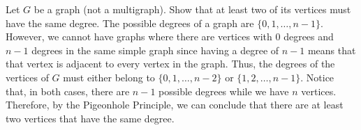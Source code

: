 \begin{hwproblem}{2}{
    Let $G$ be a graph (not a multigraph). Show that at least two of its 
    vertices must have the same degree.
  }
  The possible degrees of a graph are \(\{0, 1,
  \ldots, n-1\}\). However, we cannot have graphs where there are vertices with
  0 degrees and \(n-1\) degrees in the same simple graph since having a degree
  of \(n-1\) means that that vertex is adjacent to every vertex in the graph.
  Thus, the degrees of the vertices of \(G\) must either belong to \(\{0, 1, 
  \ldots, n-2\}\) or \(\{1, 2, \ldots, n-1\}\). Notice that, in both cases,
  there are \(n-1\) possible degrees while we have \(n\) vertices. Therefore, by
  the Pigeonhole Principle, we can conclude that there are at least two vertices
  that have the same degree.
\end{hwproblem}
